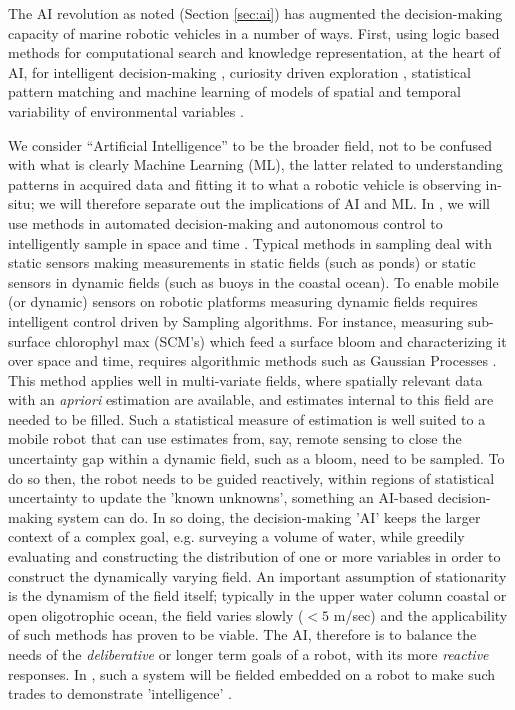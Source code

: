 The AI revolution as noted (Section \ref{sec:ai}) has augmented the
decision-making capacity of marine robotic vehicles in a number of
ways. First, using logic based methods for computational search and
knowledge representation, at the heart of AI, for intelligent
decision-making \cite{ryan10,fossum18,fossum18b}, curiosity driven
exploration \cite{girdhar14}, statistical pattern matching and machine
learning of models of spatial and temporal variability of
environmental variables \cite{fossum19b}.

We consider ``Artificial Intelligence'' to be the broader field, not
to be confused with what is clearly Machine Learning (ML), the latter
related to understanding patterns in acquired data and fitting it to
what a robotic vehicle is observing in-situ; we will therefore
separate out the implications of AI and ML. In \proe, we will use
methods in automated decision-making and autonomous control to
intelligently sample in space and time \cite{graham12}. Typical
methods in sampling deal with static sensors making measurements in
static fields (such as ponds) or static sensors in dynamic fields
(such as buoys in the coastal ocean). To enable mobile (or dynamic)
sensors on robotic platforms measuring dynamic fields requires
intelligent control driven by Sampling algorithms. For instance,
measuring sub-surface chlorophyl max (SCM's) which feed a surface
bloom and characterizing it over space and time, requires algorithmic
methods such as Gaussian Processes \cite{fossum18}. This method
applies well in multi-variate fields, where spatially relevant data
with an \emph{apriori} estimation are available, and estimates
internal to this field are needed to be filled. Such a statistical
measure of estimation is well suited to a mobile robot that can use
estimates from, say, remote sensing to close the uncertainty gap
within a dynamic field, such as a bloom, need to be sampled. To do so
then, the robot needs to be guided reactively, within regions of
statistical uncertainty to update the 'known unknowns', something an
AI-based decision-making system can do. In so doing, the
decision-making 'AI' keeps the larger context of a complex goal,
e.g. surveying a volume of water, while greedily evaluating and
constructing the distribution of one or more variables in order to
construct the dynamically varying field. An important assumption of
stationarity is the dynamism of the field itself; typically in the
upper water column coastal or open oligotrophic ocean, the field
varies slowly ($< 5$ m/sec) and the applicability of such methods has
proven to be viable. The AI, therefore is to balance the needs of the
\emph{deliberative} or longer term goals of a robot, with its more
\emph{reactive} responses. In \proe, such a system will be fielded
embedded on a robot to make such trades to demonstrate
'intelligence' \cite{fossum18,fossum18b}.

